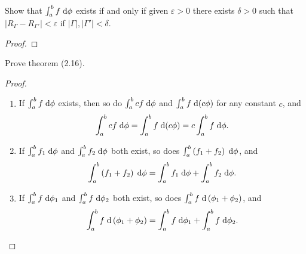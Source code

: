 \begin{problem}
Show that $\int_a^bf\;\mathrm{d}\phi$ exists if and only if given $\varepsilon>0$
there exists $\delta>0$ such that
$\left|R_\Gamma-R_{\Gamma'}\right|<\varepsilon$ if
$|\Gamma|,|\Gamma'|<\delta$.
\end{problem}
\begin{proof}
\end{proof}
\newpage

\begin{problem}
Prove theorem (2.16).
\end{problem}
\begin{proof}
\begin{theorem*}
\begin{enumerate}[label=(\roman*)]
\item If $\int_a^b f\;\mathrm{d}\phi$ exists, then so do $\int_a^bcf\;\mathrm{d}\phi$ and
  $\int_a^b f\;\mathrm{d}(c\phi)$ for any constant $c$, and
\[
\int_a^bcf\;\mathrm{d}\phi=\int_a^bf\;\mathrm{d}(c\phi)=c\int_a^bf\;\mathrm{d}\phi.
\]
\item If $\int_a^b f_1\;\mathrm{d}\phi$ and $\int_a^bf_2\;\mathrm{d}\phi$ both exist, so
  does $\int_a^b\left(f_1+f_2\right)\;\mathrm{d}\phi$, and
\[
\int_a^b\left(f_1+f_2\right)\;\mathrm{d}\phi=\int_a^bf_1\;\mathrm{d}\phi+\int_a^bf_2\;\mathrm{d}\phi.
\]
\item If $\int_a^bf\;\mathrm{d}\phi_1$ and $\int_a^bf\;\mathrm{d}\phi_2$ both exist, so
  does $\int_a^bf\;\mathrm{d}\left(\phi_1+\phi_2\right)$, and
\[
\int_a^bf\;\mathrm{d}\left(\phi_1+\phi_2\right)=\int_a^bf\;\mathrm{d}\phi_1+\int_a^bf\;\mathrm{d}\phi_2.
\]
\end{enumerate}
\end{theorem*}
\end{proof}
\newpage

